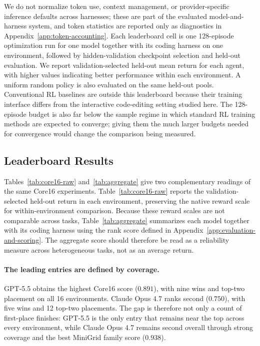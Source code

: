 We do not normalize token use, context management, or provider-specific inference defaults across harnesses; these are part of the evaluated model-and-harness system, and token statistics are reported only as diagnostics in Appendix~\ref{app:token-accounting}. Each leaderboard cell is one 128-episode optimization run for one model together with its coding harness on one environment, followed by hidden-validation checkpoint selection and held-out evaluation. We report validation-selected held-out mean return for each agent, with higher values indicating better performance within each environment. A uniform random policy is also evaluated on the same held-out pools.
Conventional RL baselines are outside this leaderboard because their training interface differs from the interactive code-editing setting studied here. The 128-episode budget is also far below the sample regime in which standard RL training methods are expected to converge; giving them the much larger budgets needed for convergence would change the comparison being measured.



\subsection{Leaderboard Results}
\label{sec:leaderboard-results}
\label{sec:aggregate-ranking}

Tables~\ref{tab:core16-raw} and~\ref{tab:aggregate} give two complementary readings of the same Core16 experiments. Table~\ref{tab:core16-raw} reports the validation-selected held-out return in each environment, preserving the native reward scale for within-environment comparison. Because these reward scales are not comparable across tasks, Table~\ref{tab:aggregate} summarizes each model together with its coding harness using the rank score defined in Appendix~\ref{app:evaluation-and-scoring}. The aggregate score should therefore be read as a reliability measure across heterogeneous tasks, not as an average return.



\paragraph{The leading entries are defined by coverage.}
GPT-5.5 obtains the highest Core16 score ($0.891$), with nine wins and top-two placement on all 16 environments. 
Claude Opus 4.7 ranks second ($0.750$), with five wins and 12 top-two placements. 
The gap is therefore not only a count of first-place finishes: GPT-5.5 is the only entry that remains near the top across every environment, while Claude Opus 4.7 remains second overall through strong coverage and the best MiniGrid family score ($0.938$).

